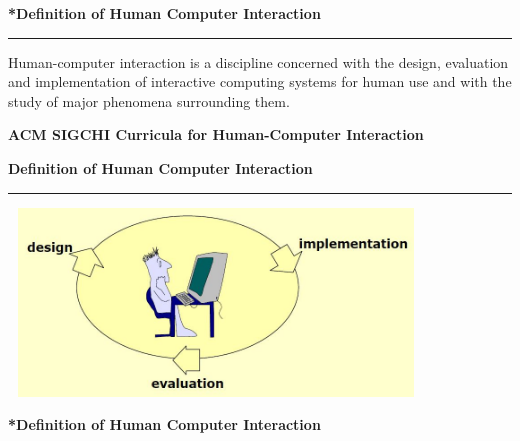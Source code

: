 \documentclass[pdf]{beamer}
\begin{document}
{{{{{
\begin{frame}
\vspace{8mm}
\textcolor{myBlue}{\textbf{\Large{*Definition of Human Computer Interaction}}}

\textcolor{red}{\rule{10cm}{1mm}}

Human-computer interaction is a discipline concerned with the design, evaluation and implementation of interactive computing systems for human use and with the study of major phenomena surrounding them.
\newline

\textbf{ACM SIGCHI Curricula for Human-Computer Interaction}


\end{frame}



{
\begin{frame}
\vspace{8mm}
\textcolor{myBlue}{\textbf{\Large{Definition of Human Computer Interaction}}}
\textcolor{red}{\rule{10cm}{1mm}}
\vspace{5mm}
\newline
\textcolor{myBlue}{{\hspace{2mm}{A discipline concerned with the}}}
\includegraphics[width=110mm, height=50mm, left]{7_design_implementation.JPG} \par
\textcolor{myBlue}{{\hspace{2mm}{of interactive computing systems for human use}}}
\vspace{5mm}
\begin{flushright}
\fontsize{0.5pt}{1pt}\selectfont{ \textcolor{lightgray}
{Saul Greenberg}}
\end{flushright}
\end{frame}



{
\begin{frame}
\vspace{8mm}
\textcolor{myBlue}{\textbf{\Large{*Definition of Human Computer Interaction}}}


\end{frame}}}}}}}}
\end{document}
